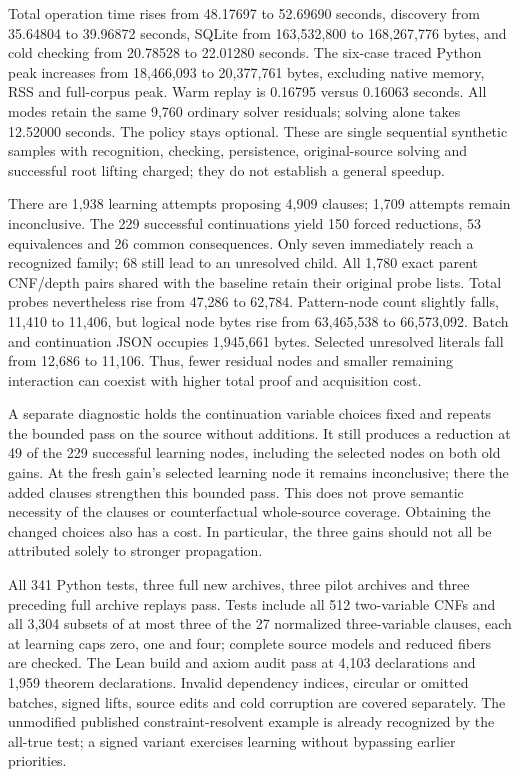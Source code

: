\documentclass[11pt,a4paper]{article}
\numberwithin{equation}{section}
\theoremstyle{plain}
\theoremstyle{definition}
\theoremstyle{remark}
\begin{document}
Total operation time rises from 48.17697 to 52.69690 seconds, discovery from 35.64804 to 39.96872 seconds, SQLite from 163,532,800 to 168,267,776 bytes, and cold checking from 20.78528 to 22.01280 seconds. The six-case traced Python peak increases from 18,466,093 to 20,377,761 bytes, excluding native memory, RSS and full-corpus peak. Warm replay is 0.16795 versus 0.16063 seconds. All modes retain the same 9,760 ordinary solver residuals; solving alone takes 12.52000 seconds. The policy stays optional. These are single sequential synthetic samples with recognition, checking, persistence, original-source solving and successful root lifting charged; they do not establish a general speedup.

There are 1,938 learning attempts proposing 4,909 clauses; 1,709 attempts remain inconclusive. The 229 successful continuations yield 150 forced reductions, 53 equivalences and 26 common consequences. Only seven immediately reach a recognized family; 68 still lead to an unresolved child. All 1,780 exact parent CNF/depth pairs shared with the baseline retain their original probe lists. Total probes nevertheless rise from 47,286 to 62,784. Pattern-node count slightly falls, 11,410 to 11,406, but logical node bytes rise from 63,465,538 to 66,573,092. Batch and continuation JSON occupies 1,945,661 bytes. Selected unresolved literals fall from 12,686 to 11,106. Thus, fewer residual nodes and smaller remaining interaction can coexist with higher total proof and acquisition cost.

A separate diagnostic holds the continuation variable choices fixed and repeats the bounded pass on the source without additions. It still produces a reduction at 49 of the 229 successful learning nodes, including the selected nodes on both old gains. At the fresh gain's selected learning node it remains inconclusive; there the added clauses strengthen this bounded pass. This does not prove semantic necessity of the clauses or counterfactual whole-source coverage. Obtaining the changed choices also has a cost. In particular, the three gains should not all be attributed solely to stronger propagation.

All 341 Python tests, three full new archives, three pilot archives and three preceding full archive replays pass. Tests include all 512 two-variable CNFs and all 3,304 subsets of at most three of the 27 normalized three-variable clauses, each at learning caps zero, one and four; complete source models and reduced fibers are checked. The Lean build and axiom audit pass at 4,103 declarations and 1,959 theorem declarations. Invalid dependency indices, circular or omitted batches, signed lifts, source edits and cold corruption are covered separately. The unmodified published constraint-resolvent example is already recognized by the all-true test; a signed variant exercises learning without bypassing earlier priorities.
\end{document}

